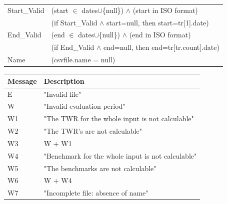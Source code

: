 \documentclass[runningheads,12pt]{article}
\begin{document}
{\begin{longtable}{|l|p{12cm}|}
\hline
 Start\_Valid & (start $\in$ dates$\cup$\{null\}) $\wedge$ (start in ISO format)\\
& (if Start\_Valid $\wedge$ start=null, then start=tr[1].date)\\

\hline
 End\_Valid & (end $\in$ dates$\cup$\{null\}) $\wedge$ (end in ISO format)\\
&(if End\_Valid $\wedge$ end=null, then end=tr[tr.count].date)\\

\hline
Name & (csvfile.name = null)\\

\hline
\end{longtable}

\centering
\begin{longtable}{|l|p{13cm}|}
\hline
\textbf{Message} & \textbf{Description}\\

\hline
 E & "Invalid file"\\

\hline
W & "Invalid evaluation period"\\

\hline
W1 & "The TWR for the whole input is not calculable"\\

\hline
W2 & "The TWR's are not calculable"\\

\hline
W3 & W + W1\\

\hline
W4 &  "Benchmark for the whole input is not calculable"\\

\hline
W5 & "The benchmarks are not calculable"\\

\hline
W6 & W + W4\\

\hline
W7 & "Incomplete file: absence of name"\\

\hline

\end{longtable}
}
\end{document}
